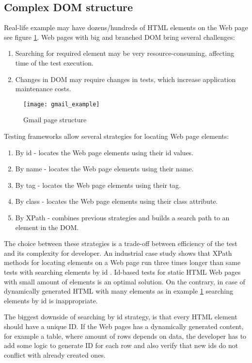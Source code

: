 	\subsection{Complex DOM structure}
    Real-life example may have dozens/hundreds of HTML
		elements on the Web page see figure
		\ref{fig:gmailexample}.
		Web pages with big and branched DOM bring several challenges:
		\begin{enumerate}
		  \item Searching for required element may be very resource-consuming,
		  affecting time of the test execution. 
		  \item Changes in DOM may require changes in tests, which increase
		  application maintenance costs.
		\end{enumerate}
		
		\begin{figure}
		\centering
		  \texttt{[image: gmail\_example]}
		  \caption{Gmail page structure}
		  \label{fig:gmailexample}
		\end{figure}
		
		Testing frameworks allow several strategies for locating Web page elements:
		\begin{enumerate}
		  \item By id - locates the Web page elements using their id values.
		  \item By name - locates the Web page elements using their name.
		  \item By tag - locates the Web page elements using their tag.
		  \item By class - locates the Web page elements using their class attribute.
		  \item By XPath - combines previous strategies and builds a search
		  path to an element in the DOM.
		\end{enumerate}
		
		The choice between these strategies is a trade-off between efficiency of
		the test and its complexity for developer. An industrial case study shows that 
		XPath methods for locating elements on a Web page run 
		three times longer than same tests with searching
    elements by id \cite{selenium4}. 
	   Id-based tests for static HTML Web pages with small amount of elements
	   is an optimal solution. On the contrary, in case of dynamically
	   generated HTML with many elements as in example \ref{fig:gmailexample}
	   searching elements by id is inappropriate.
		
		The biggest downside of searching by id strategy, is that every HTML element
		should have a unique ID. If the Web pages has a dynamically generated content,
		for example a table, where amount of rows depends on data, the
		developer has to add some logic to generate ID for each row and also verify
		that new ids do not conflict with already created ones. 
		
